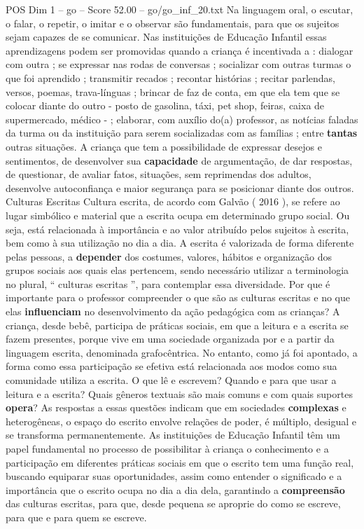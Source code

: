 \begin{textsample}{POS Dim 1 – go – Score 52.00 – go/go\_inf\_20.txt}
Na linguagem oral, o escutar, o falar, o repetir, o imitar e o observar são fundamentais, para que os sujeitos sejam capazes de se comunicar.
Nas instituições de Educação Infantil essas aprendizagens podem ser promovidas quando a criança é incentivada a : dialogar com outra ; se expressar nas rodas de conversas ; socializar com outras turmas o que foi aprendido ; transmitir recados ; recontar histórias ; recitar parlendas, versos, poemas, trava-línguas ; brincar de faz de conta, em que ela tem que se colocar diante do outro - posto de gasolina, táxi, pet shop, feiras, caixa de supermercado, médico - ; elaborar, com auxílio do(a) professor, as notícias faladas da turma ou da instituição para serem socializadas com as famílias ; entre \textbf{tantas} outras situações.
A criança que tem a possibilidade de expressar desejos e sentimentos, de desenvolver sua \textbf{capacidade} de argumentação, de dar respostas, de questionar, de avaliar fatos, situações, sem reprimendas dos adultos, desenvolve autoconfiança e maior segurança para se posicionar diante dos outros.
Culturas Escritas Cultura escrita, de acordo com Galvão ( 2016 ), se refere ao lugar simbólico e material que a escrita ocupa em determinado grupo social.
Ou seja, está relacionada à importância e ao valor atribuído pelos sujeitos à escrita, bem como à sua utilização no dia a dia.
A escrita é valorizada de forma diferente pelas pessoas, a \textbf{depender} dos costumes, valores, hábitos e organização dos grupos sociais aos quais elas pertencem, sendo necessário utilizar a terminologia no plural, “ culturas escritas ”, para contemplar essa diversidade.
Por que é importante para o professor compreender o que são as culturas escritas e no que elas \textbf{influenciam} no desenvolvimento da ação pedagógica com as crianças?
A criança, desde bebê, participa de práticas sociais, em que a leitura e a escrita se fazem presentes, porque vive em uma sociedade organizada por e a partir da linguagem escrita, denominada grafocêntrica.
No entanto, como já foi apontado, a forma como essa participação se efetiva está relacionada aos modos como sua comunidade utiliza a escrita.
O que lê e escrevem?
Quando e para que usar a leitura e a escrita?
Quais gêneros textuais são mais comuns e com quais suportes \textbf{opera}?
As respostas a essas questões indicam que em sociedades \textbf{complexas} e heterogêneas, o espaço do escrito envolve relações de poder, é múltiplo, desigual e se transforma permanentemente.
As instituições de Educação Infantil têm um papel fundamental no processo de possibilitar à criança o conhecimento e a participação em diferentes práticas sociais em que o escrito tem uma função real, buscando equiparar suas oportunidades, assim como entender o significado e a importância que o escrito ocupa no dia a dia dela, garantindo a \textbf{compreensão} das culturas escritas, para que, desde pequena se aproprie do como se escreve, para que e para quem se escreve.

\end{textsample}
